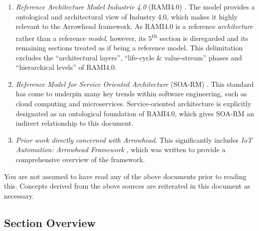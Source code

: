 \begin{enumerate}
\item \textit{Reference Architecture Model Industrie 4.0} (RAMI4.0) \cite{adolphs2016reference}.
The model provides a ontological and architectural view of Industry 4.0, which makes it highly relevant to the Arrowhead framework.
As RAMI4.0 is a reference \textit{architecture} rather than a reference \textit{model}, however, its 5\textsuperscript{th} section is disregarded and its remaining sections treated as if being a reference model.
This delimitation excludes the ``architectural layers'', ``life-cycle \& value-stream'' phases and ``hierarchical levels'' of RAMI4.0.

\item \textit{Reference Model for Service Oriented Architecture} (SOA-RM) \cite{mackenzie2006reference}.
This standard has come to underpin many key trends within software engineering, such as cloud computing and microservices.
Service-oriented architecture is explicitly designated as an ontological foundation of RAMI4.0, which gives SOA-RM an indirect relationship to this document.

\item \textit{Prior work directly concerned with Arrowhead}.
This significantly includes \textit{IoT Automation: Arrowhead Framework} \cite{delsing2017iot}, which was written to provide a comprehensive overview of the framework.

\end{enumerate}

You are not assumed to have read any of the above documents prior to reading this.
Concepts derived from the above sources are reiterated in this document as necessary.

\subsection{Section Overview}
\label{sec:introduction:sections}

